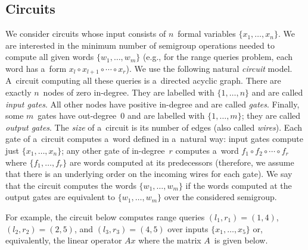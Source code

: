 \documentclass{toc}
\begin{document}
\subsection{Circuits}\label{subsec:circuits}
We consider circuits whose input consists of $n$~formal variables
$\{x_1, \dotsc, x_n\}$. We are interested in the minimum number of semigroup
operations needed to compute all given words $\{w_1, \dotsc, w_m\}$ (e.g., for
the range queries problem, each word has a~form $x_l\circ x_{l+1}\circ \dotsb \circ x_r$). We use
the following natural {\em circuit} model. A~circuit computing all these queries
is a~directed acyclic graph. There are exactly $n$~nodes of zero in-degree. They
are labelled with $\{1, \dotsc, n\}$ and are called {\em input gates}. All
other nodes have positive in-degree and are called {\em gates}. Finally, some
$m$~gates have out-degree~0 and are labelled with $\{1, \dotsc, m\}$; they are called {\em output gates}. The
{\em size} of a~circuit is its number of edges (also called {\em wires}). Each
gate of a~circuit computes a~word defined in a~natural way: input gates compute
just $\{x_1, \dotsc, x_n\}$; any other gate of in-degree~$r$ computes a~word
$f_1 \circ f_2 \circ \dotsb \circ f_r$ where $\{f_1, \dotsc, f_r\}$ are words
computed at its predecessors (therefore, we assume that there is an underlying
order on the incoming wires for each gate). We say that the circuit computes the
words $\{w_1, \dotsc, w_m\}$ if the words computed at the output gates are
equivalent to $\{w_1, \dotsc, w_m\}$ over the considered semigroup.

For example, the circuit below computes range queries
$(l_1,r_1)=(1,4)$,
$(l_2,r_2)=(2,5)$, and
$(l_3,r_3)=(4,5)$
over inputs $\{x_1, \dotsc, x_5\}$ or, equivalently, the
linear operator $Ax$ where the matrix $A$~is given below.

\vspace{5mm}
\begin{center}
\end{center}
\vspace{5mm}
\end{document}
